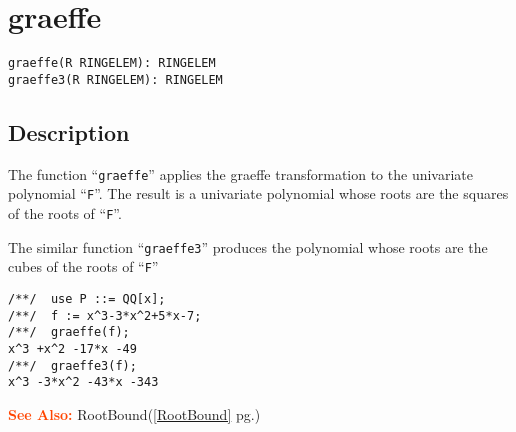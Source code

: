 \documentclass[a4paper]{mybook}
\newenvironment{command}{}{} %
\newcommand\SeeAlso{\par\textcolor{OrangeRed}{\textbf{\large See Also: }}}
\begin{document}
\section{graeffe}
\label{graeffe}
\begin{command} %


\begin{Verbatim}[label=syntax, rulecolor=\color{MidnightBlue},
frame=single]
graeffe(R RINGELEM): RINGELEM
graeffe3(R RINGELEM): RINGELEM
\end{Verbatim}


\subsection*{Description}

The function ``\verb&graeffe&'' applies the graeffe transformation to the
univariate polynomial ``\verb&F&''.  The result is a univariate polynomial
whose roots are the squares of the roots of ``\verb&F&''.
\par 
The similar function ``\verb&graeffe3&'' produces the polynomial whose roots
are the cubes of the roots of ``\verb&F&''
\begin{Verbatim}[label=example, rulecolor=\color{PineGreen}, frame=single]
/**/  use P ::= QQ[x];
/**/  f := x^3-3*x^2+5*x-7;
/**/  graeffe(f);
x^3 +x^2 -17*x -49
/**/  graeffe3(f);
x^3 -3*x^2 -43*x -343
\end{Verbatim}


\SeeAlso %
  RootBound(\ref{RootBound} pg.\pageref{RootBound})
\end{command} %
\end{document}
